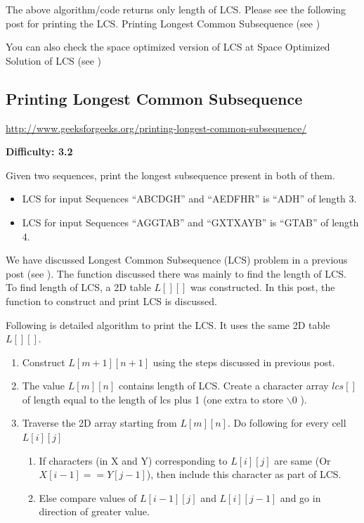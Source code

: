 The above algorithm/code returns only length of LCS. Please see the
following post for printing the LCS. Printing Longest Common Subsequence
(see )

You can also check the space optimized version of LCS at Space Optimized
Solution of LCS (see )



\subsection{Printing Longest Common Subsequence
  \label{secGFGDPLCSPrint}}

\url{http://www.geeksforgeeks.org/printing-longest-common-subsequence/}

\textbf{Difficulty: 3.2}

Given two sequences, print the longest subsequence present in both of them.

\begin{itemize}%
\item LCS for input Sequences ``ABCDGH'' and ``AEDFHR'' is ``ADH'' of length
  3.
\item LCS for input Sequences ``AGGTAB'' and ``GXTXAYB'' is ``GTAB'' of
  length 4.
\end{itemize}

We have discussed Longest Common Subsequence (LCS) problem in a previous
post (see ). The function discussed there was
mainly to find the length of LCS. To find length of LCS, a 2D table $L[][]$
was constructed. In this post, the function to construct and print LCS is
discussed.

Following is detailed algorithm to print the LCS. It uses the same 2D table
$L[][]$.
\begin{enumerate}[label=\textbf{\arabic*.}]
\item Construct $L[m+1][n+1]$ using the steps discussed in previous post.
\item The value $L[m][n]$ contains length of LCS. Create a character array
  $lcs[]$ of length equal to the length of lcs plus 1 (one extra to store
  $\backslash0$ ).
\item Traverse the 2D array starting from $L[m][n]$. Do following for every
  cell $L[i][j]$
  \begin{enumerate}[label=\textbf{\alph*.}]
  \item If characters (in X and Y) corresponding to $L[i][j]$ are same (Or
    $X[i-1] == Y[j-1]$), then include this character as part of LCS.
  \item Else compare values of $L[i-1][j]$ and $L[i][j-1]$ and go in
    direction of greater value.
  \end{enumerate}
\end{enumerate}

